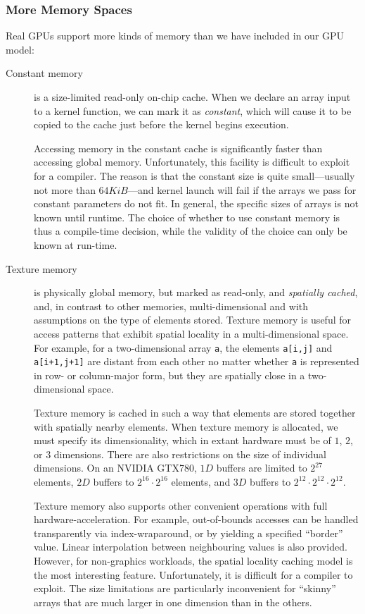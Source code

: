 \subsubsection{More Memory Spaces}

Real GPUs support more kinds of memory than we have included in our
GPU model:

\begin{description}
\item[Constant memory] is a size-limited read-only on-chip cache.
  When we declare an array input to a kernel function, we can mark it
  as \textit{constant}, which will cause it to be copied to the cache
  just before the kernel begins execution.

  Accessing memory in the constant cache is significantly faster than
  accessing global memory.  Unfortunately, this facility is difficult
  to exploit for a compiler.  The reason is that the constant size is
  quite small---usually not more than $64KiB$---and kernel launch will
  fail if the arrays we pass for constant parameters do not fit.  In
  general, the specific sizes of arrays is not known until runtime.
  The choice of whether to use constant memory is thus a compile-time
  decision, while the validity of the choice can only be known at
  run-time.

\item[Texture memory] is physically global memory, but marked as
  read-only, and \textit{spatially cached}, and, in contrast to other
  memories, multi-dimensional and with assumptions on the type of
  elements stored.  Texture memory is useful for access patterns that
  exhibit spatial locality in a multi-dimensional space.  For example,
  for a two-dimensional array \texttt{a}, the elements \texttt{a[i,j]}
  and \texttt{a[i+1,j+1]} are distant from each other no matter
  whether \texttt{a} is represented in row- or column-major form, but
  they are spatially close in a two-dimensional space.

  Texture memory is cached in such a way that elements are stored
  together with spatially nearby elements.  When texture memory is
  allocated, we must specify its dimensionality, which in extant
  hardware must be of $1$, $2$, or $3$ dimensions.  There are also
  restrictions on the size of individual dimensions.  On an NVIDIA
  GTX780, $1D$ buffers are limited to $2^{27}$ elements, $2D$ buffers
  to $2^{16}\cdot{}2^{16}$ elements, and $3D$ buffers to
  $2^{12}\cdot{}2^{12}\cdot{}2^{12}$.

  Texture memory also supports other convenient operations with full
  hardware-acceleration.  For example, out-of-bounds accesses can be
  handled transparently via index-wraparound, or by yielding a
  specified ``border'' value.  Linear interpolation between
  neighbouring values is also provided.  However, for non-graphics
  workloads, the spatial locality caching model is the most
  interesting feature.  Unfortunately, it is difficult for a compiler
  to exploit.  The size limitations are particularly inconvenient for
  ``skinny'' arrays that are much larger in one dimension than in the
  others.


\end{description}
